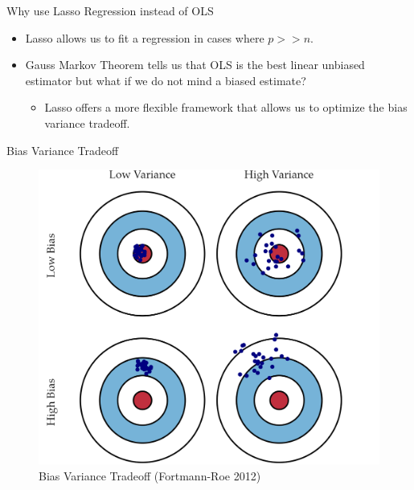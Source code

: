 \documentclass[
  11pt,
  ignorenonframetext,
]{beamer}
\providecommand{\tightlist}{%
  \setlength{\itemsep}{0pt}\setlength{\parskip}{0pt}}
\begin{document}
\begin{frame}{Why use Lasso Regression instead of OLS}
\protect\hypertarget{why-use-lasso-regression-instead-of-ols}{}
\begin{itemize}
\item
  Lasso allows us to fit a regression in cases where \(p>>n\).
\item
  Gauss Markov Theorem tells us that OLS is the best linear unbiased
  estimator but what if we do not mind a biased estimate?

  \begin{itemize}
  \tightlist
  \item
    Lasso offers a more flexible framework that allows us to optimize
    the bias variance tradeoff.
  \end{itemize}
\end{itemize}
\end{frame}

\begin{frame}{Bias Variance Tradeoff}
\protect\hypertarget{bias-variance-tradeoff}{}
\begin{figure}

{\centering \includegraphics[width=0.7\linewidth]{./../figures/Bias_Variance} 

}

\caption{Bias Variance Tradeoff (Fortmann-Roe 2012)}\label{fig:unnamed-chunk-6}
\end{figure}
\end{frame}
\end{document}
